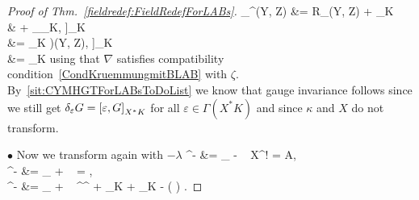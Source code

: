 \documentclass[preprint]{elsarticle}
\def\bas#1\eas{\begin{align*}#1\end{align*}}
\theoremstyle{plain}
\theoremstyle{remark}
\theoremstyle{definition}
\begin{document}
\begin{proof}[Proof of Thm.~\ref{fieldredef:FieldRedefForLABs}]
\bas
R_{\widetilde{\nabla}^\lambda}(Y, Z)\mu
&=
R_\nabla(Y, Z) \mu
	+ \Big[ \underbrace{- \nabla_Y(\lambda(Z)) + \nabla_Z(\lambda(Y)) + \lambda([Y, Z])}_{= ~- \mathrm{d}^\nabla \lambda}, \mu \Big]_K \\
&\hspace{1cm}
	+ 
	_{\mleft[ \mleft[ \lambda(Y), \lambda(Z) \mright]_K, \mu \mright]_K} \\
&=
\mleft[ \mleft(\zeta - \mathrm{d}^\nabla \lambda + \frac{1}{2} \mleft[ \lambda \stackrel{\wedge}{,} \lambda \mright]_K \mright)(Y, Z), \mu  \mright]_K \\
&=
_K
\eas
using that $\nabla$ satisfies compatibility condition~\eqref{CondKruemmungmitBLAB} with $\zeta$. By~\ref{sit:CYMHGTForLABsToDoList} we know that gauge invariance follows since we still get $\delta_\varepsilon G = \mleft[ \varepsilon, G \mright]_{X^*K}$ for all $\varepsilon \in \Gamma(X^*K)$ and since $\kappa$ and $X$ do not transform.

$\bullet$ Now we transform again with $-\lambda$
\bas
\widehat{A}^{-\lambda}
&=
_{}
	- ~ X^!\lambda
=
A, \\
\widehat{\nabla}^{-\lambda}
&=
\underbrace{\widetilde{\nabla}^{\lambda}}_{}
	+ ~  \circ \lambda
=
\nabla, \\
\widehat{\zeta}^{-\lambda}
&=
\underbrace{\widetilde{\zeta}^\lambda}_{}
	+ ~ ^{\widetilde{\nabla}^\lambda} \lambda
	+  \mleft[ \lambda \stackrel{\wedge}{,} \lambda \mright]_K
\zeta + \mleft[ \lambda \stackrel{\wedge}{,} \lambda \mright]_K
	- ( \circ \lambda) \wedge \lambda
{}
\zeta.
\eas
\end{proof}
\end{document}
